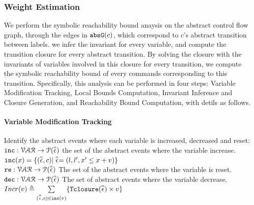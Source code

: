 \subsubsection{Weight Estimation}
\label{sec:alg_weightgen}
%




We perform the symbolic reachability bound anaysis on the abstract control flow graph, 
through the edges in $\mathtt{abs}{\mathtt{G}}(c)$, which correspond to $c$'s abstract transition between labels.
we infer the invariant for every variable, and compute the transition closure for every abstract transition. By solving the closure
with the invariants of variables involved in this closure for every transition, we compute
the symbolic reachability bound of every commands corresponding to this transition. Specifically, this analysis can be performed in four steps:
 Variable Modification Tracking, Local Bounds Computation,
Invariant Inference and Closure Generation, and Reachability Bound Computation,
% 
with detils as follows.
%
\paragraph*{Variable Modification Tracking}
Identify the abstract events where each variable is increased, decreased and reset:
\\
$\mathtt{inc}: \mathcal{VAR} \to \mathcal{P}(\stackrel{\scriptscriptstyle{\alpha}}{\mathtt{\epsilon}{}}) $
the set of the abstract events where the variable increase.
\\
$\mathtt{inc}(x) = \{(\stackrel{\scriptscriptstyle{\alpha}}{\mathtt{\epsilon}{}}, c) | \stackrel{\scriptscriptstyle{\alpha}}{\mathtt{\epsilon}{}} = (l, l', x' \leq x + v)\}$
\\
$\mathtt{re}: \mathcal{VAR} \to \mathcal{P}(\stackrel{\scriptscriptstyle{\alpha}}{\mathtt{\epsilon}{}}) $
The set of the abstract events where the variable is reset.
\\
$\mathtt{dec}: \mathcal{VAR} \to \mathcal{P}(\stackrel{\scriptscriptstyle{\alpha}}{\mathtt{\epsilon}{}}) $
The set of abstract events where the variable decrease.
\\
$Incr(v) \triangleq \sum\limits_{(\stackrel{\scriptscriptstyle{\alpha}}{\mathtt{\epsilon}{}}, c) \in \mathtt{inc}(v)}\{{\mathtt{Tclosure}}(\stackrel{\scriptscriptstyle{\alpha}}{\mathtt{\epsilon}{}}) \times v\}$
%
